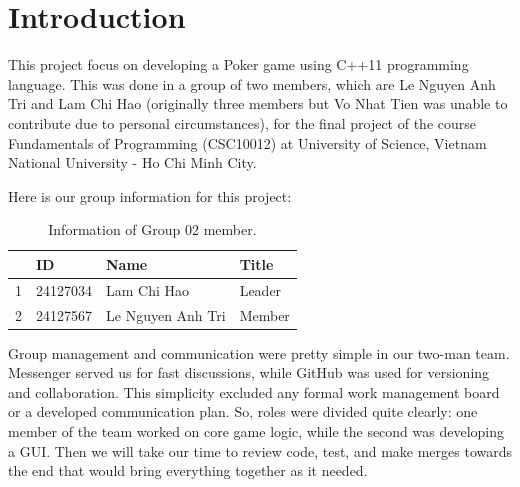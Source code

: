 \section{Introduction}
\label{sec:introduction}

\hspace{1cm} This project focus on developing a Poker game using C++11 programming language. This was done in a group of two members, which are Le Nguyen Anh Tri and Lam Chi Hao (originally three members but Vo Nhat Tien was unable to contribute due to personal circumstances), for the final project of the course Fundamentals of Programming (CSC10012) at University of Science, Vietnam National University - Ho Chi Minh City.

\vspace{0.5cm}

\hspace{1cm} Here is our group information for this project:
\begin{table}[ht]
    \centering
    \begin{tabular}{| m{1.75cm} | m{2cm} | m{5cm}| m{2.5cm} |} 
    \hline
    \textbf{} & \textbf{ID} & \textbf{Name} & \textbf{Title} \\ 
    \hline
    1 & 24127034 & Lam Chi Hao & Leader \\ 
    \hline
    2 & 24127567 & Le Nguyen Anh Tri & Member \\ 
    \hline
    \end{tabular}
    \caption{Information of Group 02 member.}
    \label{tab:group-information-table}
\end{table}

\vspace{0.5cm}

\hspace{1cm} Group management and communication were pretty simple in our two-man team. Messenger served us for fast discussions, while GitHub was used for versioning and collaboration. This simplicity excluded any formal work management board or a developed communication plan. So, roles were divided quite clearly: one member of the team worked on core game logic, while the second was developing a GUI. Then we will take our time to review code, test, and make merges towards the end that would bring everything together as it needed.

\vspace{0.5cm}

